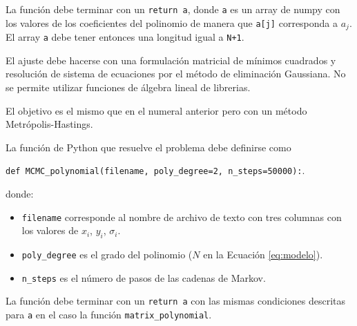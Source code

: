 \documentclass[11pt,letterpaper]{exam}
\begin{document}
\begin{questions}
La funci\'on debe terminar con un \verb"return a", donde \verb"a" es un
array de numpy con los valores de los coeficientes del polinomio de
manera que \verb"a[j]" corresponda a $a_j$. El array \verb"a" debe
tener entonces una longitud igual a \verb"N+1".  

El ajuste debe hacerse con una formulaci\'on matricial de m\'inimos
cuadrados y resoluci\'on de sistema de ecuaciones por el m\'etodo de
eliminaci\'on Gaussiana.
No se permite utilizar funciones de \'algebra lineal de librerias.



El objetivo es el mismo que en el numeral anterior pero con un
m\'etodo Metr\'opolis-Hastings.

La funci\'on de Python que resuelve el problema debe definirse como 

\verb"def MCMC_polynomial(filename, poly_degree=2, n_steps=50000):".  


donde:

\begin{itemize}
\item \verb"filename" corresponde al nombre de archivo de texto con
  tres columnas con los valores de $x_i$, $y_i$, $\sigma_i$.
\item \verb"poly_degree" es el grado del polinomio ($N$ en
  la Ecuaci\'on \ref{eq:modelo}).
\item \verb"n_steps" es el n\'umero de pasos de las cadenas de Markov.
\end{itemize}

La funci\'on debe terminar con un \verb"return a" con las mismas
condiciones descritas para \verb"a" en el caso la funci\'on
\verb"matrix_polynomial". 

\end{questions}
\end{document}
